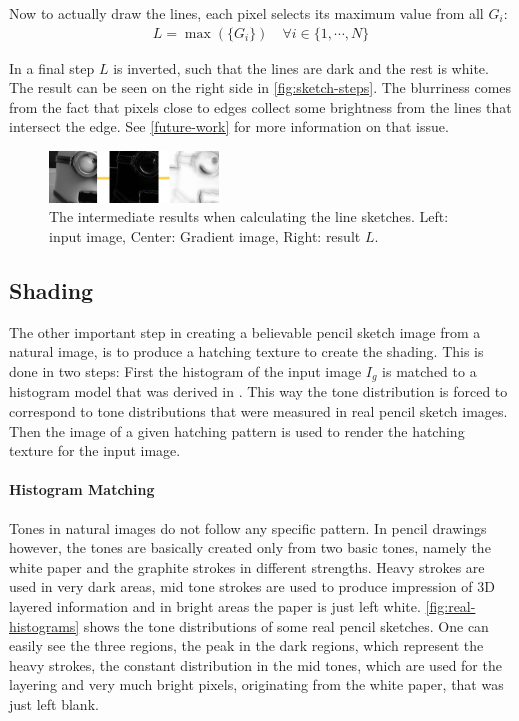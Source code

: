 Now to actually draw the lines, each pixel selects its maximum value from all
$G_i$:
\begin{align}
 L = \max(\lbrace G_i\rbrace) \quad \forall i \in  \lbrace1,\cdots,N\rbrace
 \label{eq:L}
\end{align}

In a final step $L$ is inverted, such that the lines are dark and the rest is
white. The result can be seen on the right side in \autoref{fig:sketch-steps}.
The blurriness comes from the fact that pixels close to edges collect some
brightness from the lines that intersect the edge. See \autoref{future-work} for
more information on that issue.

\begin{figure}[htb]
  \centering
  \includegraphics[width=0.4\textwidth]{images/sketch-steps.png}
  \caption{The intermediate results when calculating the line sketches. Left:
  input image, Center: Gradient image, Right: result $L$.}
  \label{fig:sketch-steps}
\end{figure}

\subsection{Shading}
The other important step in creating a believable pencil sketch image from a
natural image, is to produce a hatching texture to create the shading. This is
done in two steps: First the histogram of the input image $I_g$ is matched to a
histogram model that was derived in \cite{mainPaper}. This way the tone
distribution is forced to correspond to tone distributions that were measured in
real pencil sketch images. Then the image of a given hatching pattern is used to
render the hatching texture for the input image. 

\paragraph{Histogram Matching}
Tones in natural images do not follow any specific pattern. In pencil drawings
however, the tones are basically created only from two basic tones, namely the
white paper and the graphite strokes in different strengths. Heavy strokes are
used in very dark areas, mid tone strokes are used to produce impression of 3D
layered information and in bright areas the paper is just left white.
\autoref{fig:real-histograms} shows the tone distributions of some real pencil
sketches. One can easily see the three regions, the peak in the dark regions,
which represent the heavy strokes, the constant distribution in the mid tones,
which are used for the layering and very much bright pixels, originating from
the white paper, that was just left blank.

